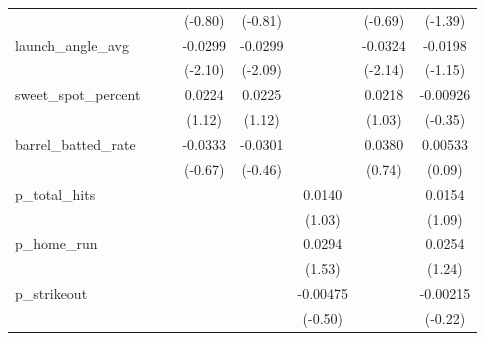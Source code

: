 {\begin{tabular}{l*{7}{c}}
            &                     &                     &     (-0.80)         &     (-0.81)         &                     &     (-0.69)         &     (-1.39)         \\
[1em]
launch\_angle\_avg&                     &                     &     -0.0299\sym{*}  &     -0.0299\sym{*}  &                     &     -0.0324\sym{*}  &     -0.0198         \\
            &                     &                     &     (-2.10)         &     (-2.09)         &                     &     (-2.14)         &     (-1.15)         \\
[1em]
sweet\_spot\_percent&                     &                     &      0.0224         &      0.0225         &                     &      0.0218         &    -0.00926         \\
            &                     &                     &      (1.12)         &      (1.12)         &                     &      (1.03)         &     (-0.35)         \\
[1em]
barrel\_batted\_rate&                     &                     &     -0.0333         &     -0.0301         &                     &      0.0380         &     0.00533         \\
            &                     &                     &     (-0.67)         &     (-0.46)         &                     &      (0.74)         &      (0.09)         \\
[1em]
p\_total\_hits&                     &                     &                     &                     &      0.0140         &                     &      0.0154         \\
            &                     &                     &                     &                     &      (1.03)         &                     &      (1.09)         \\
[1em]
p\_home\_run  &                     &                     &                     &                     &      0.0294         &                     &      0.0254         \\
            &                     &                     &                     &                     &      (1.53)         &                     &      (1.24)         \\
[1em]
p\_strikeout &                     &                     &                     &                     &    -0.00475         &                     &    -0.00215         \\
            &                     &                     &                     &                     &     (-0.50)         &                     &     (-0.22)         \\

\end{tabular}}

